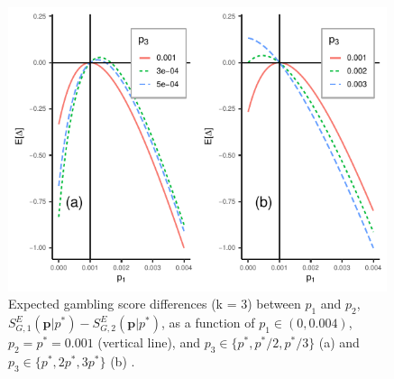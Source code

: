 \documentclass[referee,sn-basic]{sn-jnl}
\theoremstyle{thmstyleone}%
\theoremstyle{thmstyletwo}%
\theoremstyle{thmstylethree}%
\begin{document}
\begin{figure}
  \includegraphics[width = 0.99\textwidth]{figure3.pdf}
\caption{Expected gambling score differences (k = 3) between $p_1$ and $p_2$, $S^E_{G,1}(\mathbf p\vert p^*) - S^E_{G,2}(\mathbf p\vert p^*)$, as a function of $p_1 \in (0,0.004)$, $p_2 = p^* = 0.001$ (vertical line), and  $p_3 \in \{p^*, p^*/2, p^*/3\}$ (a) and $p_3 \in \{p^*, 2p^*, 3p^*\}$ (b) .}
\label{fig:3}
\end{figure}
\end{document}
